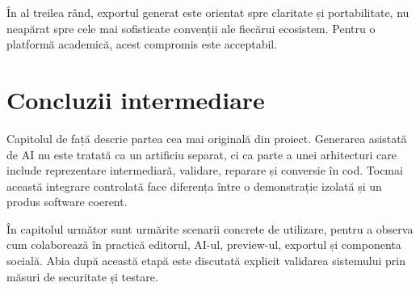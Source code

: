 În al treilea rând, exportul generat este orientat spre claritate și portabilitate, nu neapărat spre cele mai sofisticate convenții ale fiecărui ecosistem. Pentru o platformă academică, acest compromis este acceptabil.

\section{Concluzii intermediare}

Capitolul de față descrie partea cea mai originală din proiect. Generarea asistată de AI nu este tratată ca un artificiu separat, ci ca parte a unei arhitecturi care include reprezentare intermediară, validare, reparare și conversie în cod. Tocmai această integrare controlată face diferența între o demonstrație izolată și un produs software coerent.

În capitolul următor sunt urmărite scenarii concrete de utilizare, pentru a observa cum colaborează în practică editorul, AI-ul, preview-ul, exportul și componenta socială. Abia după această etapă este discutată explicit validarea sistemului prin măsuri de securitate și testare.
